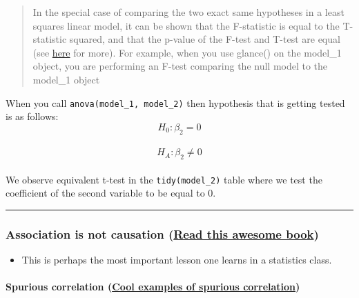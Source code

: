 \documentclass[]{article}
\providecommand{\tightlist}{%
  \setlength{\itemsep}{0pt}\setlength{\parskip}{0pt}}
\let\oldparagraph\paragraph
\renewcommand{\paragraph}[1]{\oldparagraph{#1}\mbox{}}
\begin{document}
\begin{quote}
In the special case of comparing the two exact same hypotheses in a
least squares linear model, it can be shown that the F-statistic is
equal to the T-statistic squared, and that the p-value of the F-test and
T-test are equal (see
\href{https://canovasjm.netlify.com/2018/10/29/when-does-the-f-test-reduce-to-t-test/}{here}
for more). For example, when you use glance() on the model\_1 object,
you are performing an F-test comparing the null model to the model\_1
object
\end{quote}

When you call \texttt{anova(model\_1,\ model\_2)} then hypothesis that
is getting tested is as follows:\\
\[H_0: \beta_2=0\]\\
\[H_A: \beta_2\neq0\]\\
We observe equivalent t-test in the \texttt{tidy(model\_2)} table where
we test the coefficient of the second variable to be equal to 0.

\begin{center}\rule{0.5\linewidth}{\linethickness}\end{center}

\hypertarget{association-is-not-causation-read-this-awesome-book}{%
\subsubsection{\texorpdfstring{Association is not causation
(\href{https://rafalab.github.io/dsbook/association-is-not-causation.html}{Read
this awesome
book})}{Association is not causation (Read this awesome book)}}\label{association-is-not-causation-read-this-awesome-book}}

\begin{itemize}
\tightlist
\item
  This is perhaps the most important lesson one learns in a statistics
  class.
\end{itemize}

\hypertarget{spurious-correlation-cool-examples-of-spurious-correlation}{%
\paragraph{\texorpdfstring{Spurious correlation
(\href{http://tylervigen.com/spurious-correlations}{Cool examples of
spurious
correlation})}{Spurious correlation (Cool examples of spurious correlation)}}\label{spurious-correlation-cool-examples-of-spurious-correlation}}
\end{document}
